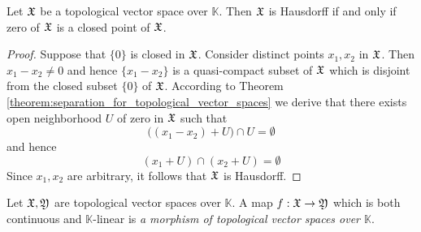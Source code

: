 \begin{corollary}\label{corollary:criterion_for_Hausdorffness_for_topological_vector_spaces}
Let ${\mathfrak X}$ be a topological vector space over $\mathbb{K}$. Then ${\mathfrak X}$ is Hausdorff if and only if zero of ${\mathfrak X}$ is a closed point of ${\mathfrak X}$.
\end{corollary}
\begin{proof}
Suppose that $\{0\}$ is closed in ${\mathfrak X}$. Consider distinct points $x_1,x_2$ in ${\mathfrak X}$. Then $x_1 - x_2 \neq 0$ and hence $\{x_1 - x_2\}$ is a quasi-compact subset of ${\mathfrak X}$ which is disjoint from the closed subset $\{0\}$ of ${\mathfrak X}$. According to Theorem \ref{theorem:separation_for_topological_vector_spaces} we derive that there exists open neighborhood $U$ of zero in ${\mathfrak X}$ such that 
$$\big(\left(x_1 - x_2\right) + U\big) \cap U = \emptyset$$
and hence
$$\left(x_1 + U\right)\cap \left(x_2 + U\right) = \emptyset$$
Since $x_1,x_2$ are arbitrary, it follows that ${\mathfrak X}$ is Hausdorff.
\end{proof}

\begin{definition}
Let ${\mathfrak X},{\mathfrak Y}$ are topological vector spaces over $\mathbb{K}$. A map $f:{\mathfrak X}\rightarrow {\mathfrak Y}$ which is both continuous and $\mathbb{K}$-linear is \textit{a morphism of topological vector spaces over $\mathbb{K}$}.
\end{definition}

